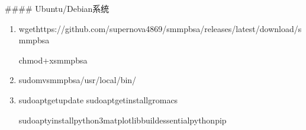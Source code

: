 \documentclass[letterpaper,10pt,english]{sphinxmanual}
\begin{document}
\sphinxAtStartPar
\#\#\#\# Ubuntu/Debian系统
\begin{enumerate}
%
\item {} 
\sphinxAtStartPar
{}

\begin{sphinxVerbatim}[commandchars=\\\{\}]
wgethttps://github.com/supernova4869/s\PYGZus{}mmpbsa/releases/latest/download/s\PYGZus{}mmpbsa

chmod+xs\PYGZus{}mmpbsa
\end{sphinxVerbatim}

\item {} 
\sphinxAtStartPar
{}

\begin{sphinxVerbatim}[commandchars=\\\{\}]
sudomvs\PYGZus{}mmpbsa/usr/local/bin/
\end{sphinxVerbatim}

\item {} 
\sphinxAtStartPar
{}

\begin{sphinxVerbatim}[commandchars=\\\{\}]
sudoapt\PYGZhy{}getupdate
sudoapt\PYGZhy{}getinstallgromacs

sudoapt\PYGZhy{}yinstallpython3\PYGZhy{}matplotlibbuild\PYGZhy{}essentialpython\PYGZhy{}pip
\end{sphinxVerbatim}

\end{enumerate}
\end{document}
